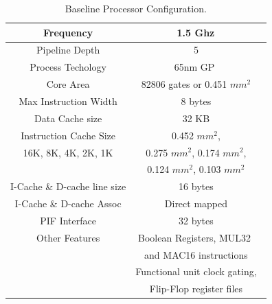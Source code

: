 \begin{center}
\begin{table}
\begin{tabular}{|c|c|}
\hline
Frequency & 1.5 Ghz\ \\
\hline
Pipeline Depth & 5\ \\
\hline
Process Techology & 65nm GP \ \\
\hline
Core Area & 82806 gates or 0.451 $mm^2$\ \\
\hline
Max Instruction Width & 8 bytes\ \\
\hline
Data Cache size & 32 KB\ \\
\hline
Instruction Cache Size & 0.452 $mm^2$,\ \\
16K, 8K, 4K, 2K, 1K  & 0.275 $mm^2$, 0.174 $mm^2$,\ \\
 & 0.124 $mm^2$, 0.103 $mm^2$\ \\
\hline
I-Cache \& D-cache line size & 16 bytes\ \\
\hline
I-Cache \& D-cache Assoc & Direct mapped\ \\
\hline
PIF Interface & 32 bytes\ \\
\hline
Other Features & Boolean Registers, MUL32 \ \\ 
& and MAC16 instructions\ \\
& Functional unit clock gating,\ \\ 
& Flip-Flop register files\ \\
\hline
\end{tabular}
\caption{Baseline Processor Configuration.}
\label{tab:p_config}
\end{table}
\end{center}